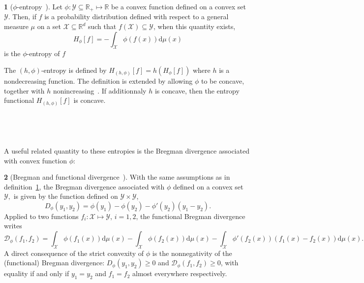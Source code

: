 \documentclass[english,sort&compress]{elsarticle}
\theoremstyle{definition}
\newtheorem{defn}{\protect\definitionname}
\theoremstyle{plain}
\theoremstyle{plain}
\providecommand{\definitionname}{Definition}
\def\dmu{\mathrm{d}\mu}
\def\fD{\mathcal{D}}
\def\Rset{\mathbb{R}}
\def\X{\mathcal{X}}
\def\Y{\mathcal{Y}}
\begin{document}
\begin{defn}[$\phi$-entropy~\cite{Csi67, SalMen93, Sal94}]
\label{def:phi-entropy}
Let $\phi: \Y \subseteq \Rset_+ \mapsto \Rset$ be a convex function defined on a
convex  set $\Y$.   Then,  if $f$  is  a probability  distribution defined  with
respect to  a general measure  $\mu$ on a  set $\X \subseteq \Rset^d$  such that
$f(\X) \subseteq \Y$, when this quantity exists,
  \begin{equation}\label{eq:phi-entropy}
    H_{\phi}[f] = - \int_\X \phi(f(x)) \dmu(x)
  \end{equation}
  is  the $\phi$-entropy  of  $f$
\end{defn}
%
The $(h,\phi)$-entropy is defined by $H_{(h,\phi)}[f] = h\left(H_\phi[f]\right)$
where $h$ is  a nondecreasing function.  The definition  is extended by allowing
$\phi$  to be  concave, together  with $h$  nonincreasing~\cite{Csi67, SalMen93,
  Sal94, MenMor97}. If additionnaly $h$  is concave, then the entropy functional
$H_{(h,\phi)}[f]$ is concave.

\


\

A  useful  related  quantity  to  these  entropies  is  the  Bregman  divergence
associated with convex function $\phi$:
%
\begin{defn}[Bregman and functional divergence~\cite{Bre67, Bas13}]
\label{def:Bregman}
With the  same assumptions  as in definition~\ref{def:phi-entropy},  the Bregman
divergence associated with $\phi$ defined on  a convex set $\Y,$ is given by the
function defined on $\Y \times \Y$,
  \begin{equation}\label{eq:Bregman}
    D_\phi(y_1,y_2) = \phi(y_1) - \phi(y_2) - \phi'(y_2) \left(y_1-y_2\right).
  \end{equation}
  Applied  to two  functions  $f_i: \X  \mapsto  \Y$, $i=1,  2$, the  functional
  Bregman divergence writes
  \begin{equation}
  \label{eq:FctBregman}
  \fD_\phi(f_1,f_2)  =  \int_\X  \phi(f_1(x))  \dmu(x)  -  \int_\X  \phi(f_2(x))
  \dmu(x) - \int_\X \phi'(f_2(x)) \left( f_1(x) - f_2(x) \right) \dmu(x).
  \end{equation}
  A direct consequence of the strict convexity of $\phi$ is the nonnegativity of
  the   (functional)   Bregman   divergence:   $D_\phi(y_1,y_2)   \ge   0$   and
  $\fD_\phi(f_1,f_2) \ge 0$, with equality if and  only if $y_1 = y_2$ and $f_1 =
  f_2$ almost everywhere respectively.
\end{defn}
\end{document}
